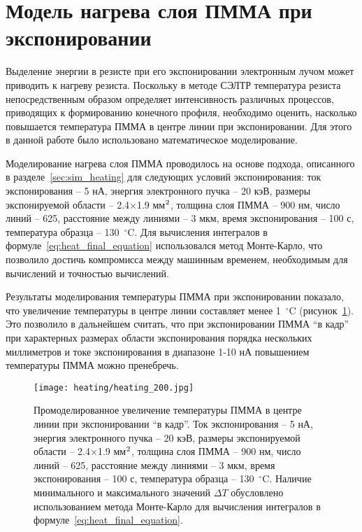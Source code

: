 \section{Модель нагрева слоя ПММА при экспонировании}

Выделение энергии в резисте при его экспонировании электронным лучом может приводить к нагреву резиста. Поскольку в методе СЭЛТР температура резиста непосредственным образом определяет интенсивность различных процессов, приводящих к формированию конечного профиля, необходимо оценить, насколько повышается температура ПММА в центре линии при экспонировании. Для этого в данной работе было использовано математическое моделирование.

Моделирование нагрева слоя ПММА проводилось на основе подхода, описанного в разделе~\ref{sec:sim_heating} для следующих условий экспонирования: ток экспонирования -- 5 нА, энергия электронного пучка -- 20 кэВ, размеры экспонируемой области -- 2.4$\times$1.9 мм$^\text{2}$, толщина слоя ПММА -- 900 нм, число линий -- 625, расстояние между линиями -- 3 мкм, время экспонирования -- 100 с, температура образца -- 130~$^\circ$C. Для вычисления интегралов в формуле~\ref{eq:heat_final_equation} использовался метод Монте-Карло, что позволило достичь компромисса между машинным временем, необходимым для вычислений и точностью вычислений.

Результаты моделирования температуры ПММА при экспонировании показало, что увеличение температуры в центре линии составляет менее 1~$^\circ$C (рисунок~\ref{fig:heating}). Это позволило в дальнейшем считать, что при экспонировании ПММА ``в кадр'' при характерных размерах области экспонирования порядка нескольких миллиметров и токе экспонирования в диапазоне 1-10 нА повышением температуры ПММА можно пренебречь.

\begin{figure}[h!]
	\begin{center}
		\texttt{[image: heating/heating\_200.jpg]}
	\end{center}
	\vspace{-1em}
	\caption{Промоделированное увеличение температуры ПММА в центре линии при экспонировании ``в кадр''. Ток экспонирования -- 5 нА, энергия электронного пучка -- 20 кэВ, размеры экспонируемой области -- 2.4$\times$1.9 мм$^\text{2}$, толщина слоя ПММА -- 900 нм, число линий -- 625, расстояние между линиями -- 3 мкм, время экспонирования -- 100 с, температура образца -- 130~$^\circ$C. Наличие минимального и максимального значений $\Delta T$ обусловлено использованием метода Монте-Карло для вычисления интегралов в формуле~\ref{eq:heat_final_equation}.}
	\label{fig:heating}
\end{figure}




